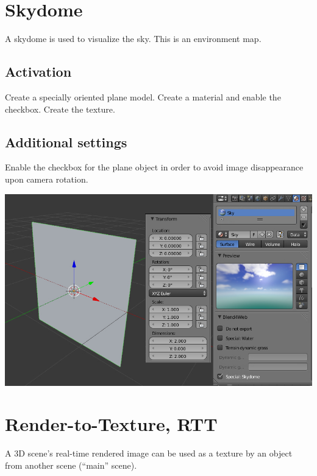 \documentclass[a4paper,12pt,oneside]{sphinxmanual}
\begin{document}
\section{Skydome}
\label{textures:skydome}\label{textures:skydome-texture}\label{textures:index-12}
A skydome is used to visualize the sky. This is an environment map.


\subsection{Activation}
\label{textures:id22}
Create a specially oriented plane model. Create a material and enable the  checkbox. Create the  texture.


\subsection{Additional settings}
\label{textures:id23}
Enable the  checkbox for the plane object in order to avoid image disappearance upon camera rotation.

{\hfill\includegraphics[width=1.000\linewidth]{skydome.jpg}\hfill}

\begin{DUlineblock}{0em}
\item[] 
\end{DUlineblock}
\label{textures:render-to-texture}

\section{Render-to-Texture, RTT}
\label{textures:render-to-texture-rtt}\label{textures:index-13}
A 3D scene's real-time rendered image can be used as a texture by an object from another scene (``main'' scene).
\end{document}
